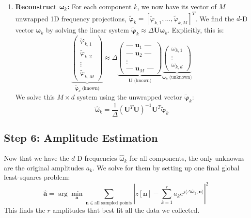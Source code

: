 \begin{enumerate}
    \item \textbf{Reconstruct $\boldsymbol{\omega}_k$:} For each component $k$, we now have its vector of $M$ unwrapped 1D frequency projections, $\boldsymbol{\tilde{\varphi}}_k = [\tilde{\varphi}_{k,1}, \dots, \tilde{\varphi}_{k,M}]^T$. We find the $d$-D vector $\boldsymbol{\omega}_k$ by solving the linear system $\boldsymbol{\tilde{\varphi}}_k \approx \Delta \mathbf{U} \boldsymbol{\omega}_k$.
    Explicitly, this is:
    $$
    \underbrace{\begin{pmatrix} \tilde{\varphi}_{k,1} \\ \tilde{\varphi}_{k,2} \\ \vdots \\ \tilde{\varphi}_{k,M} \end{pmatrix}}_{\boldsymbol{\tilde{\varphi}}_k \text{ (known)}}
    \approx \Delta
    \underbrace{\begin{pmatrix} \text{--- } \boldsymbol{u}_1 \text{ ---} \\ \text{--- } \boldsymbol{u}_2 \text{ ---} \\ \vdots \\ \text{--- } \boldsymbol{u}_M \text{ ---} \end{pmatrix}}_{\mathbf{U} \text{ (known)}}
    \underbrace{\begin{pmatrix} \omega_{k,1} \\ \vdots \\ \omega_{k,d} \end{pmatrix}}_{\boldsymbol{\omega}_k \text{ (unknown)}}
    $$
    We solve this $M \times d$ system using the unwrapped vector $\boldsymbol{\tilde{\varphi}}_k$:
    $$ \hat{\boldsymbol{\omega}}_k = \frac{1}{\Delta} (\mathbf{U}^T \mathbf{U})^{-1} \mathbf{U}^T \boldsymbol{\tilde{\varphi}}_k $$
\end{enumerate}

\subsection{Step 6: Amplitude Estimation}
Now that we have the $d$-D frequencies $\hat{\boldsymbol{\omega}}_k$ for all components, the only unknowns are the original amplitudes $a_k$.
We solve for them by setting up one final global least-squares problem:
$$ \hat{\boldsymbol{a}} = \arg\min_{\boldsymbol{a}} \sum_{\boldsymbol{n} \in \text{all sampled points}} \left|
z[\boldsymbol{n}] - \sum_{k=1}^r a_k e^{j\langle \Delta \hat{\boldsymbol{\omega}}_k, \boldsymbol{n} \rangle} \right|^2 $$
This finds the $r$ amplitudes that best fit all the data we collected.

